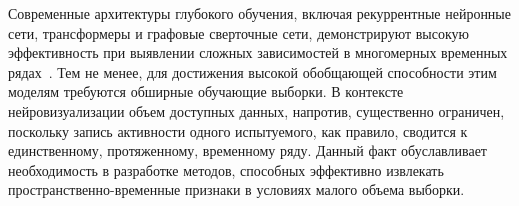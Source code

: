 Современные архитектуры глубокого обучения, включая рекуррентные нейронные сети, трансформеры и графовые сверточные сети, демонстрируют высокую эффективность при выявлении сложных зависимостей в многомерных временных рядах~\cite{hochreiter1997long, vaswani2017attention, dai2023classification}. Тем не менее, для достижения высокой обобщающей способности этим моделям требуются обширные обучающие выборки. В контексте нейровизуализации объем доступных данных, напротив, существенно ограничен, поскольку запись активности одного испытуемого, как правило, сводится к единственному, протяженному, временному ряду. Данный факт обуславливает необходимость в разработке методов, способных эффективно извлекать пространственно-временные признаки в условиях малого объема выборки.
